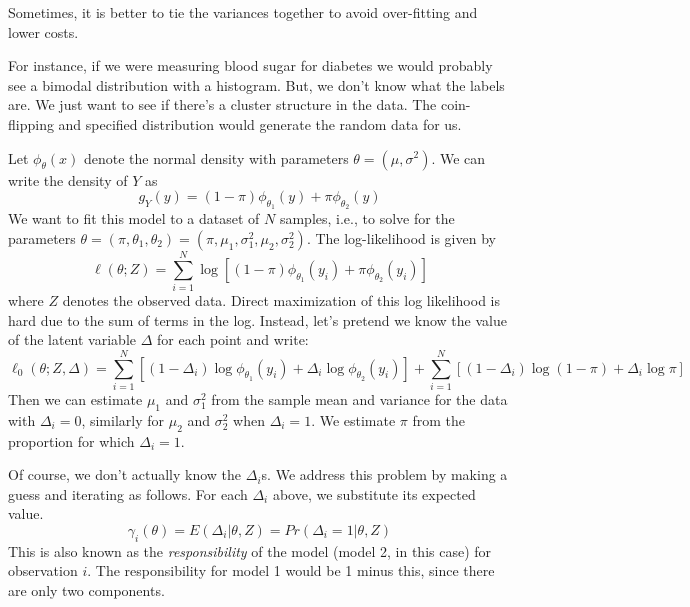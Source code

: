 \documentclass[a4paper]{article}
\begin{document}
Sometimes, it is better to tie the variances together to avoid over-fitting and lower costs.

For instance, if we were measuring blood sugar for diabetes we would probably see a bimodal distribution with a histogram.  
But, we don't know what the labels are.  We just want to see if there's a cluster structure in the data. The coin-flipping and specified distribution would generate the random data for us.

Let $\phi_\theta(x)$ denote the normal density with parameters $\theta = (\mu, \sigma^2)$.  
We can write the density of $Y$ as
$$
g_Y(y) = (1 - \pi)\phi_{\theta_{1}}(y) + \pi\phi_{\theta_{2}}(y)
$$
We want to fit this model to a dataset of $N$ samples, i.e.,  to solve for the parameters $\theta = (\pi, \theta_1, \theta_2) = (\pi, \mu_1, \sigma_1^2, \mu_2, \sigma_2^2)$.  
The log-likelihood is given by
$$
\ell(\theta;Z) = \sum_{i=1}^N \log[(1-\pi)\phi_{\theta_{1}}(y_i) + \pi \phi_{\theta_{2}}(y_i) ]
$$
where $Z$ denotes the observed data.  
Direct maximization of this log likelihood is hard due to the sum of terms in the log.  
Instead, let's pretend we know the value of the latent variable $\Delta$ for each point and write:
$$
\ell_0(\theta; Z, \Delta) = \sum_{i=1}^N [(1-\Delta_i) \log \phi_{\theta_{1}}(y_i) + \Delta_i \log \phi_{\theta_{2}}(y_i)] + \sum_{i=1}^N [(1-\Delta_i) \log (1-\pi) + \Delta_i \log \pi]
$$
Then we can estimate $\mu_1$ and $\sigma_1^2$ from the sample mean and variance for the data with $\Delta_i = 0$, similarly for $\mu_2$ and $\sigma_2^2$ when $\Delta_i=1$. 
We estimate $\pi$ from the proportion for which $\Delta_i =1$.

Of course, we don't actually know the $\Delta_i$s.  
We address this problem by making a guess and iterating as follows.  
For each $\Delta_i$ above, we substitute its expected value.
$$
\gamma_i(\theta) = E(\Delta_i | \theta, Z) = Pr(\Delta_i = 1 | \theta, Z)
$$
This is also known as the \emph{responsibility} of the model (model 2, in this case) for observation $i$.  
The responsibility for model 1 would be 1 minus this, since there are only two components.
\end{document}
